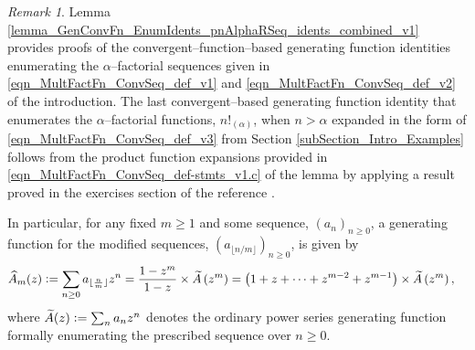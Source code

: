 \documentclass[12pt,reqno]{article}
\numberwithin{sfootnote}{section}
\numberwithin{equation}{section}
\theoremstyle{plain}
\theoremstyle{definition}
\theoremstyle{remark}
\newtheorem{remark}[theorem]{Remark}
\newcommand{\defequals}{\ensuremath{\vcentcolon=}}
\newcommand{\MultiFactorial}[2]{\ensuremath{#1!_{\left(#2\right)}}}
\begin{document}
\begin{remark} 
Lemma \ref{lemma_GenConvFn_EnumIdents_pnAlphaRSeq_idents_combined_v1} 
provides proofs of the convergent--function--based 
generating function identities enumerating the $\alpha$--factorial 
sequences given in 
\eqref{eqn_MultFactFn_ConvSeq_def_v1} and 
\eqref{eqn_MultFactFn_ConvSeq_def_v2} of the introduction. 
The last convergent--based generating function identity that enumerates the 
$\alpha$--factorial functions, $\MultiFactorial{n}{\alpha}$, when 
$n > \alpha$ expanded in the form of 
\eqref{eqn_MultFactFn_ConvSeq_def_v3} from 
Section \ref{subSection_Intro_Examples} 
follows from the product function expansions provided in 
\eqref{eqn_MultFactFn_ConvSeq_def-stmts_v1.c} of the lemma by 
applying a result proved in the exercises section of the reference 
\citep[\S 7, Ex.\ 7.36; p.\ 569]{GKP}. 

In particular, for any fixed $m \geq 1$ and some sequence, 
$\left(a_n\right)_{n \geq 0}$, a generating function for the 
modified sequences, $\left(a_{\lfloor n/m \rfloor}\right)_{n \geq 0}$, is 
given by 
\begin{align*} 
\widehat{A}_m(z) & \defequals 
     \sum_{n \geq 0} a_{\lfloor \frac{n}{m} \rfloor} z^{n} = 
     \frac{1-z^{m}}{1-z} \times \widetilde{A}\left(z^{m}\right) = 
     \left(1 + z + \cdots + z^{m-2} + z^{m-1}\right) \times 
     \widetilde{A}\left(z^{m}\right), 
\end{align*} 
where $\widetilde{A}(z) \defequals \sum_{n} a_n z^{n}$ denotes the 
ordinary power series generating function formally enumerating the 
prescribed sequence over $n \geq 0$. 
\end{remark} 
\end{document}
